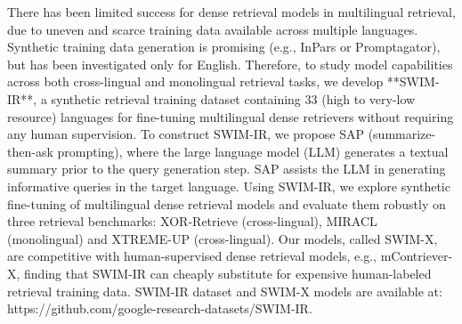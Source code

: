 There has been limited success for dense retrieval models in multilingual retrieval, due to uneven and scarce training data available across multiple languages. Synthetic training data generation is promising (e.g., InPars or Promptagator), but has been investigated only for English. Therefore, to study model capabilities across both cross-lingual and monolingual retrieval tasks, we develop **SWIM-IR**, a synthetic retrieval training dataset containing 33 (high to very-low resource) languages for fine-tuning multilingual dense retrievers without requiring any human supervision. To construct SWIM-IR, we propose SAP (summarize-then-ask prompting), where the large language model (LLM) generates a textual summary prior to the query generation step. SAP assists the LLM in generating informative queries in the target language. Using SWIM-IR, we explore synthetic fine-tuning of multilingual dense retrieval models and evaluate them robustly on three retrieval benchmarks: XOR-Retrieve (cross-lingual), MIRACL (monolingual) and XTREME-UP (cross-lingual).  Our models, called SWIM-X, are competitive with human-supervised dense retrieval models, e.g., mContriever-X, finding that SWIM-IR can cheaply substitute for expensive human-labeled retrieval training data. SWIM-IR dataset and SWIM-X models are available at: https://github.com/google-research-datasets/SWIM-IR.
